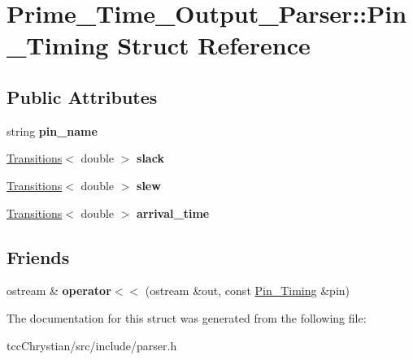 \hypertarget{structPrime__Time__Output__Parser_1_1Pin__Timing}{\section{Prime\-\_\-\-Time\-\_\-\-Output\-\_\-\-Parser\-:\-:Pin\-\_\-\-Timing Struct Reference}
\label{structPrime__Time__Output__Parser_1_1Pin__Timing}
}
\subsection*{Public Attributes}
\begin{DoxyCompactItemize}
\item 
\hypertarget{structPrime__Time__Output__Parser_1_1Pin__Timing_adf3b868ae9f5a9cf5fa4605431bef741}{string {\bfseries pin\-\_\-name}}\label{structPrime__Time__Output__Parser_1_1Pin__Timing_adf3b868ae9f5a9cf5fa4605431bef741}

\item 
\hypertarget{structPrime__Time__Output__Parser_1_1Pin__Timing_a9619e81ea7b859c6c600daaaf3754051}{\hyperlink{classTransitions}{Transitions}$<$ double $>$ {\bfseries slack}}\label{structPrime__Time__Output__Parser_1_1Pin__Timing_a9619e81ea7b859c6c600daaaf3754051}

\item 
\hypertarget{structPrime__Time__Output__Parser_1_1Pin__Timing_af7d7bae7417f6586e445c5bb415a1d43}{\hyperlink{classTransitions}{Transitions}$<$ double $>$ {\bfseries slew}}\label{structPrime__Time__Output__Parser_1_1Pin__Timing_af7d7bae7417f6586e445c5bb415a1d43}

\item 
\hypertarget{structPrime__Time__Output__Parser_1_1Pin__Timing_a2737c385dec9bd775aa20f860293fbd0}{\hyperlink{classTransitions}{Transitions}$<$ double $>$ {\bfseries arrival\-\_\-time}}\label{structPrime__Time__Output__Parser_1_1Pin__Timing_a2737c385dec9bd775aa20f860293fbd0}

\end{DoxyCompactItemize}
\subsection*{Friends}
\begin{DoxyCompactItemize}
\item 
\hypertarget{structPrime__Time__Output__Parser_1_1Pin__Timing_a8ea07e765281219a4b6c4adf6c2274ea}{ostream \& {\bfseries operator$<$$<$} (ostream \&out, const \hyperlink{structPrime__Time__Output__Parser_1_1Pin__Timing}{Pin\-\_\-\-Timing} \&pin)}\label{structPrime__Time__Output__Parser_1_1Pin__Timing_a8ea07e765281219a4b6c4adf6c2274ea}

\end{DoxyCompactItemize}


The documentation for this struct was generated from the following file\-:\begin{DoxyCompactItemize}
\item 
tcc\-Chrystian/src/include/parser.\-h\end{DoxyCompactItemize}

